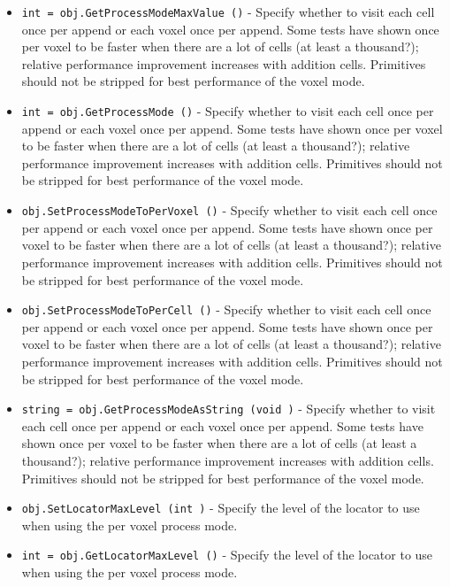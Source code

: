 \begin{itemize}
\item  \verb|int = obj.GetProcessModeMaxValue ()| -  Specify whether to visit each cell once per append or each voxel once
 per append.  Some tests have shown once per voxel to be faster
 when there are a lot of cells (at least a thousand?); relative
 performance improvement increases with addition cells.  Primitives
 should not be stripped for best performance of the voxel mode.  

\item  \verb|int = obj.GetProcessMode ()| -  Specify whether to visit each cell once per append or each voxel once
 per append.  Some tests have shown once per voxel to be faster
 when there are a lot of cells (at least a thousand?); relative
 performance improvement increases with addition cells.  Primitives
 should not be stripped for best performance of the voxel mode.  

\item  \verb|obj.SetProcessModeToPerVoxel ()| -  Specify whether to visit each cell once per append or each voxel once
 per append.  Some tests have shown once per voxel to be faster
 when there are a lot of cells (at least a thousand?); relative
 performance improvement increases with addition cells.  Primitives
 should not be stripped for best performance of the voxel mode.  

\item  \verb|obj.SetProcessModeToPerCell ()| -  Specify whether to visit each cell once per append or each voxel once
 per append.  Some tests have shown once per voxel to be faster
 when there are a lot of cells (at least a thousand?); relative
 performance improvement increases with addition cells.  Primitives
 should not be stripped for best performance of the voxel mode.  

\item  \verb|string = obj.GetProcessModeAsString (void )| -  Specify whether to visit each cell once per append or each voxel once
 per append.  Some tests have shown once per voxel to be faster
 when there are a lot of cells (at least a thousand?); relative
 performance improvement increases with addition cells.  Primitives
 should not be stripped for best performance of the voxel mode.  

\item  \verb|obj.SetLocatorMaxLevel (int )| -  Specify the level of the locator to use when using the per voxel
 process mode.

\item  \verb|int = obj.GetLocatorMaxLevel ()| -  Specify the level of the locator to use when using the per voxel
 process mode.


\end{itemize}
